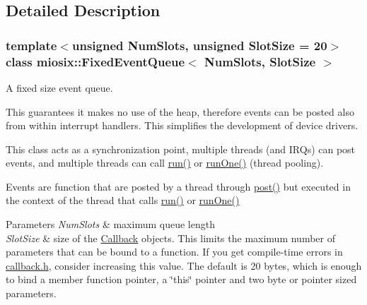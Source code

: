 \subsection{Detailed Description}
\subsubsection*{template$<$unsigned Num\-Slots, unsigned Slot\-Size = 20$>$class miosix\-::\-Fixed\-Event\-Queue$<$ Num\-Slots, Slot\-Size $>$}

A fixed size event queue.

This guarantees it makes no use of the heap, therefore events can be posted also from within interrupt handlers. This simplifies the development of device drivers.

This class acts as a synchronization point, multiple threads (and I\-R\-Qs) can post events, and multiple threads can call \hyperlink{classmiosix_1_1_fixed_event_queue_a57c1a42529747f00c9e2dfcbd0aadffe}{run()} or \hyperlink{classmiosix_1_1_fixed_event_queue_ae861b6c4a206878671abc5d7c302470f}{run\-One()} (thread pooling).

Events are function that are posted by a thread through \hyperlink{classmiosix_1_1_fixed_event_queue_a8ca9a4c812f569d8cf1e27f67cf9175d}{post()} but executed in the context of the thread that calls \hyperlink{classmiosix_1_1_fixed_event_queue_a57c1a42529747f00c9e2dfcbd0aadffe}{run()} or \hyperlink{classmiosix_1_1_fixed_event_queue_ae861b6c4a206878671abc5d7c302470f}{run\-One()}


\begin{DoxyParams}{Parameters}
{\em Num\-Slots} & maximum queue length \\
\hline
{\em Slot\-Size} & size of the \hyperlink{classmiosix_1_1_callback}{Callback} objects. This limits the maximum number of parameters that can be bound to a function. If you get compile-\/time errors in \hyperlink{callback_8h_source}{callback.\-h}, consider increasing this value. The default is 20 bytes, which is enough to bind a member function pointer, a \char`\"{}this\char`\"{} pointer and two byte or pointer sized parameters. \\
\hline
\end{DoxyParams}


